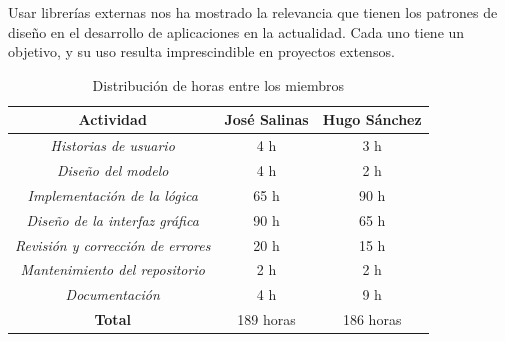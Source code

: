 \documentclass[11pt]{article}
\begin{document}
Usar librerías externas nos ha mostrado la relevancia que tienen los patrones de diseño en el desarrollo de aplicaciones en la actualidad. Cada uno tiene un objetivo, y su uso resulta imprescindible en proyectos extensos.

\vspace{2ex}

\begin{table}[h!]
	\centering
	\begin{tabular}{|c|c|c|}
		\hline
		\textbf{Actividad} & \textbf{José Salinas} & \textbf{Hugo Sánchez} \\
		\hline
		\textit{Historias de usuario} & 4 h & 3 h \\
		\hline
		\textit{Diseño del modelo} & 4 h & 2 h\\
		\hline
		\textit{Implementación de la lógica} & 65 h & 90 h\\
		\hline
		\textit{Diseño de la interfaz gráfica} & 90 h & 65 h\\
		\hline
        \textit{Revisión y corrección de errores} & 20 h & 15 h\\
		\hline
        \textit{Mantenimiento del repositorio} & 2 h & 2 h\\
		\hline
		\textit{Documentación} &  4 h &  9 h \\
		\hline
		\textbf{Total} & 189 horas & 186 horas\\
		\hline
	\end{tabular}
	\caption{Distribución de horas entre los miembros}
\end{table}



\end{document}
